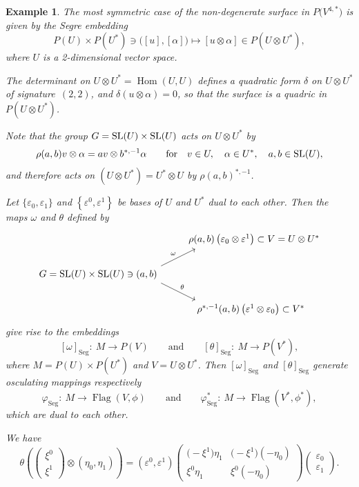 \documentclass[pdftex]{sigma}%
\newcommand{\Flag}{\operatorname{Flag}}
\newcommand{\Hom}{\operatorname{Hom}}
\newtheorem{ex}[thm]{Example}
\numberwithin{equation}{section}
\begin{document}
\begin{ex}
The most symmetric case of the non-degenerate surface in $P\big(V^{4,*}\big)$ is given by the Segre embedding
\[
P(U)\times P(U^*) \ni \big([u],[\alpha]\big)\mapsto [u\otimes\alpha]\in P(U\otimes U^*),
\]
where $U$ is a 2-dimensional vector space.

The determinant on $U\otimes U^*=\Hom(U,U)$ defines a quadratic form $\delta$ on $U\otimes U^*$ of signa\-ture~$(2,2)$, and $\delta(u\otimes \alpha)=0$, so that the surface is a quadric in $P(U\otimes U^*)$.

Note that the group $G={\rm SL}(U)\times {\rm SL}(U)$ acts on $U\otimes U^*$ by
\[
\rho(a,b)v\otimes \alpha = av\otimes b^{*,-1}\alpha\qquad\text{for}\quad
v\in U,\quad \alpha\in U^*,\quad a,b\in {\rm SL}(U),
\]
and therefore acts on $(U\otimes U^*) = U^*\otimes U$ by $\rho(a,b)^{*,-1}$.

Let $\{\varepsilon_0,\varepsilon_1\}$ and $\left\{\varepsilon^0,\varepsilon^1\right\}$ be bases of $U$ and $U^*$ dual to each other. Then the maps $\omega$ and $\theta$ defined by
\[
\begin{tikzcd}
& \rho(a,b)\left(\varepsilon_0\otimes \varepsilon^{1}\right)\subset V=U\otimes U^* \\
G={\rm SL}(U)\times {\rm SL}(U)\ni(a,b)
\arrow[ur, "\omega", start anchor={[xshift=6ex]}, end anchor={[xshift=-4ex]}]
\arrow[dr, "\theta", start anchor={[xshift=6ex]}, end anchor={[xshift=-4ex]}] & \\
& \!\!\!\!\rho^{*,-1}(a,b)\left(\varepsilon^1\otimes \varepsilon_0\right)\subset V^*
\end{tikzcd}
\]
give rise to the embeddings
\[
[\omega]_{\text{Seg}}\colon\ M\to P(V)\qquad\text{and}\qquad
[\theta]_{\text{Seg}}\colon\ M\to P(V^*),
\]
where $M=P(U)\times P(U^*)$ and $V=U\otimes U^*$. Then $[\omega]_{\text{Seg}}$ and $[\theta]_{\text{Seg}}$ generate osculating mappings respectively
\[
\varphi_{\text{Seg}}\colon\ M \to \Flag(V,\phi)\qquad\text{and}\qquad
\varphi_{\text{Seg}}^*\colon\ M\to\Flag(V^*,\phi^*),
\]
which are dual to each other.

We have
\[
\theta \left( \begin{pmatrix}\xi^0\\\xi^1\end{pmatrix}\otimes (\eta_0, \eta_1)\right) =
\left(\varepsilon^0,\varepsilon^1\right)
\begin{pmatrix}
\big({-}\xi^1\big)\eta_1 & \big({-}\xi^1\big)(-\eta_0) \\
\xi^0\eta_1 & \xi^0(-\eta_0)
\end{pmatrix}
\begin{pmatrix}
\varepsilon_0 \\
\varepsilon_1
\end{pmatrix}\!.
\]


\end{ex}
\end{document}
